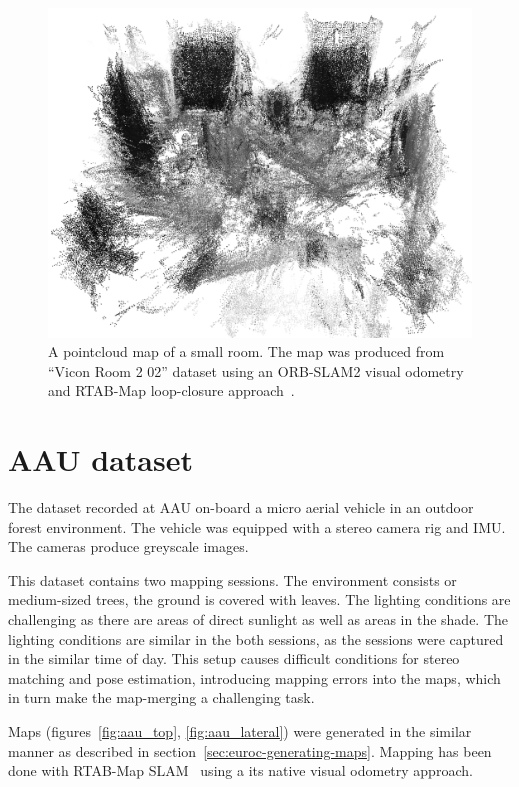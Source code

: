 \begin{figure}
    \centering
    \includegraphics[width=\textwidth]{../img/euroc_v2_02.png}
    \caption[Pointcloud map of a small room]{A pointcloud map of a small room. The map was produced from ``Vicon Room 2 02'' dataset using an {ORB-SLAM2} visual odometry~\citep{mur2017orb} and RTAB-Map loop-closure approach~\citep{labbe2014online}.}
    \label{fig:euroc_v2_02}
\end{figure}

\section{AAU dataset}
\label{sec:aau-dataset}

The dataset recorded at \acrfull{AAU} on-board a micro aerial vehicle in an outdoor forest environment. The vehicle was equipped with a stereo camera rig and \gls{IMU}. The cameras produce greyscale images.

This dataset contains two mapping sessions. The environment consists or medium-sized trees, the ground is covered with leaves. The lighting conditions are challenging as there are areas of direct sunlight as well as areas in the shade. The lighting conditions are similar in the both sessions, as the sessions were captured in the similar time of day. This setup causes difficult conditions for stereo matching and pose estimation, introducing mapping errors into the maps, which in turn make the map-merging a challenging task.

Maps (figures~\ref{fig:aau_top}, \ref{fig:aau_lateral}) were generated in the similar manner as described in section~\ref{sec:euroc-generating-maps}. Mapping has been done with RTAB-Map \gls{SLAM}~\citep{labbe2014online} using a its native visual odometry approach.

